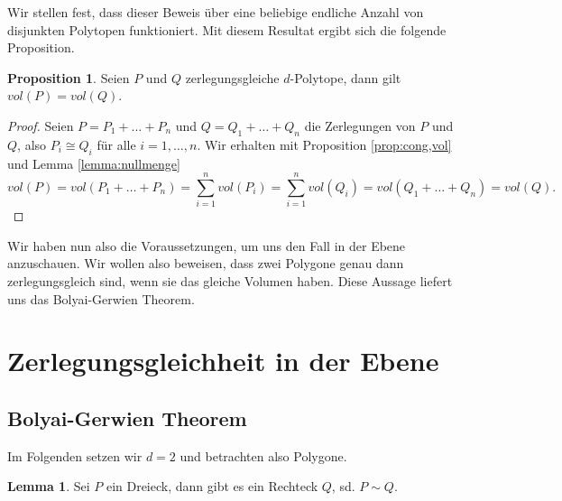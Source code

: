 \documentclass[11pt,titlepage]{article}
\theoremstyle{definition}
\newtheorem{proposition}[theorem]{Proposition}
\newtheorem{lemma}[theorem]{Lemma}
\theoremstyle{remark}
\begin{document}
	Wir stellen fest, dass dieser Beweis über eine beliebige endliche Anzahl von disjunkten 
	Polytopen funktioniert. Mit diesem Resultat ergibt sich die folgende Proposition.
	
	\begin{proposition} \label{prop:zerl,vol}
		Seien $P$ und $Q$ zerlegungsgleiche $d$-Polytope, dann gilt $vol(P)=vol(Q)$.
	\end{proposition}
	
	\begin{proof}
		Seien $P=P_1+\ldots+P_n$ und $Q=Q_1+\ldots+Q_n$ die Zerlegungen von $P$ und 
		$Q$, also $P_i\cong Q_i$ für alle $i=1,\ldots,n$. Wir erhalten mit Proposition \ref{prop:cong,vol} und Lemma \ref{lemma:nullmenge} 
		\[vol(P)=vol(P_1+\ldots+P_n)=\sum_{i=1}^n vol(P_i)=\sum_{i=1}^n vol(Q_i)=vol(Q_1+\ldots+Q_n)=vol(Q).\]
	\end{proof}
	
	Wir haben nun also die Voraussetzungen, um uns den Fall in der Ebene 
	anzuschauen. Wir wollen also beweisen, dass zwei Polygone genau 
	dann zerlegungsgleich sind, wenn sie das gleiche Volumen haben. 
	Diese Aussage liefert uns das Bolyai-Gerwien Theorem.

	\newpage
	
	\section{Zerlegungsgleichheit in der Ebene}
	
	\subsection{Bolyai-Gerwien Theorem}
	
	Im Folgenden setzen wir $d=2$ und betrachten also Polygone.
	
	\begin{lemma}
		Sei $P$ ein Dreieck, dann gibt es ein Rechteck $Q$, sd. $P\sim Q$. \label{lemma:dreieck,rechteck}
	\end{lemma}
	
\end{document}
